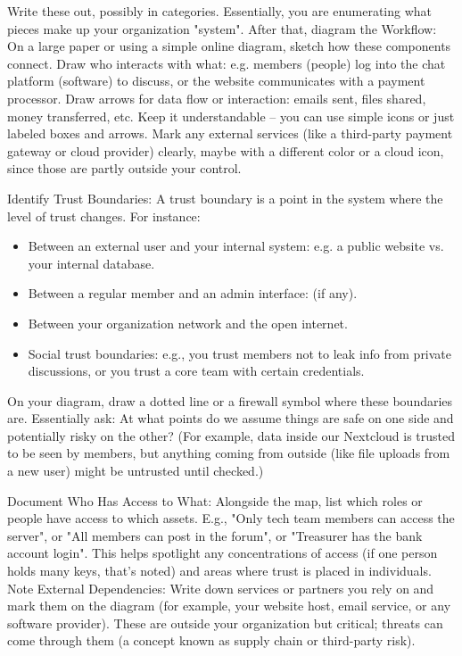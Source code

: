 Write these out, possibly in categories. Essentially, you are enumerating what
pieces make up your organization "system". After that, diagram the Workflow: On
a large paper or using a simple online diagram, sketch how these components
connect. Draw who interacts with what: e.g. members (people) log into the chat
platform (software) to discuss, or the website communicates with a payment
processor. Draw arrows for data flow or interaction: emails sent, files shared,
money transferred, etc. Keep it understandable – you can use simple icons or
just labeled boxes and arrows. Mark any external services (like a third-party
payment gateway or cloud provider) clearly, maybe with a different color or a
cloud icon, since those are partly outside your control.

Identify Trust Boundaries: A trust boundary is a point in the system where the
level of trust changes. For instance:

\begin{itemize}
    \item Between an external user and your internal system: e.g. a public
website vs. your internal database.
    \item Between a regular member and an admin interface: (if any).
    \item Between your organization network and the open internet.
    \item Social trust boundaries: e.g., you trust members not to leak info from
private discussions, or you trust a core team with certain credentials.
\end{itemize}

On your diagram, draw a dotted line or a firewall symbol where these boundaries
are. Essentially ask: At what points do we assume things are safe on one side
and potentially risky on the other? (For example, data inside our Nextcloud is
trusted to be seen by members, but anything coming from outside (like file
uploads from a new user) might be untrusted until checked.)

Document Who Has Access to What: Alongside the map, list which roles or people have
access to which assets. E.g., "Only tech team members can access the server", or "All
members can post in the forum", or "Treasurer has the bank account login". This
helps spotlight any concentrations of access (if one person holds many keys,
that's noted) and areas where trust is placed in individuals. Note External
Dependencies: Write down services or partners you rely on and mark them on the
diagram (for example, your website host, email service, or any software
provider). These are outside your organization but critical; threats can come through
them (a concept known as supply chain or third-party risk).

